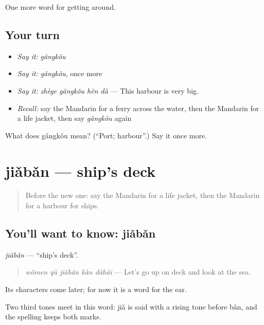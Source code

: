 \begin{grammarlens}[title={What you've built}]
One more word for getting around.
\end{grammarlens}

\subsection*{Your turn}
\begin{itemize}
\raggedright
  \item \emph{Say it:} \emph{gǎngkǒu}
  \item \emph{Say it:} \emph{gǎngkǒu}, once more
  \item \emph{Say it:} \emph{zhège gǎngkǒu hěn dà} — This harbour is very big.
  \item \emph{Recall:} say the Mandarin for a ferry across the water, then the Mandarin for a life jacket, then say \emph{gǎngkǒu} again
\end{itemize}

\begin{tcolorbox}[breakable,colback=teal!4,colframe=teal!35!black,title={Before you move on}]
What does gǎngkǒu mean? (\textquotedblleft{}Port; harbour\textquotedblright{}.) Say it once more.
\end{tcolorbox}
\section[jiǎbǎn]{jiǎbǎn — ship's deck}

\label{lesson:ZH-C412-jiaban}



\begin{quote}
Before the new one: say the Mandarin for a life jacket, then the Mandarin for a harbour for ships.
\end{quote}

\subsection*{You'll want to know: jiǎbǎn}
\emph{jiǎbǎn} — \textquotedblleft{}ship's deck\textquotedblright{}.

\begin{quote}
\emph{wǒmen qù jiǎbǎn kàn dàhǎi} — Let's go up on deck and look at the sea.
\end{quote}

Its characters come later; for now it is a word for the ear.

Two third tones meet in this word: jiǎ is said with a rising tone before bǎn, and the spelling keeps both marks.

